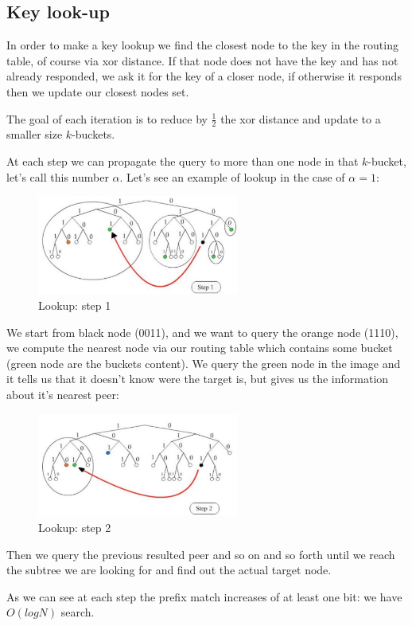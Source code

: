 \subsection{Key look-up}
In order to make a key lookup we find the closest node to the key in the routing table, of course via xor distance.
If that node does not have the key and has not already responded, we ask it for the key of a closer node, if otherwise it responds then we update our closest nodes set.

The goal of each iteration is to reduce by $\frac{1}{2}$ the xor distance and update to a smaller size $k$-buckets.

At each step we can propagate the query to more than one node in that $k$-bucket, let's call this number $\alpha$.
Let's see an example of lookup in the case of $\alpha = 1$:
\begin{figure}[H]
    \centering
    \includegraphics[width=250px]{images/3_DHT/05.png}
    \caption{Lookup: step 1}
\end{figure}
We start from black node (0011), and we want to query the orange node (1110), we compute the nearest node via our routing table which contains some bucket (green node are the buckets content).
We query the green node in the image and it tells us that it doesn't know were the target is, but gives us the information about it's nearest peer:
\begin{figure}[H]
    \centering
    \includegraphics[width=250px]{images/3_DHT/06.png}
    \caption{Lookup: step 2}
\end{figure}
Then we query the previous resulted peer and so on and so forth until we reach the subtree we are looking for and find out the actual target node.

As we can see at each step the prefix match increases of at least one bit: we have $O(log N)$ search.

